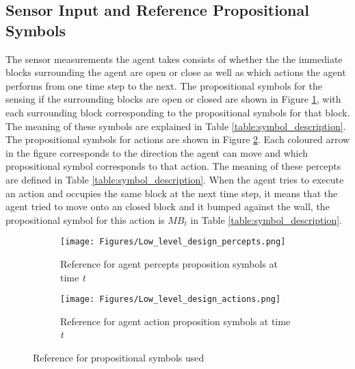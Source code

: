 \subsection{Sensor Input and Reference Propositional Symbols}
\label{subsec: sensor_prop_symbols}

The sensor measurements the agent takes consists of whether the the immediate blocks surrounding the agent are open or close as well as which actions the agent performs from one time step to the next. The propositional symbols for the sensing if the surrounding blocks are open or closed are shown in Figure \ref{subfig:agent_in_env_low_level_percepts}, with each surrounding block corresponding to the propositional symbols for that block. The meaning of these symbols are explained in Table \ref{table:symbol_description}. The propositional symbols for actions are shown in  Figure \ref{subfig:agent_in_env_low_level_action}. Each coloured arrow in the figure corresponds to the direction the agent can move and which propositional symbol corresponds to that action. The meaning of these percepts are defined in Table \ref{table:symbol_description}. When the agent tries to execute an action and occupies the same block at the next time step, it means that the agent tried to move onto an closed block and it bumped against the wall, the propositional symbol for this action is $MB_{t}$ in Table \ref{table:symbol_description}.

\begin{figure}[H]
\captionsetup[subfigure]{justification=centering}
\centering
\begin{subfigure}{.5\textwidth}
    \centering
    \texttt{[image: Figures/Low\_level\_design\_percepts.png]}
    \caption{Reference for agent percepts proposition symbols at time \textit{t}} 
    \label{subfig:agent_in_env_low_level_percepts}
\end{subfigure}%
\begin{subfigure}{.5\textwidth}
    \centering
    \texttt{[image: Figures/Low\_level\_design\_actions.png]}
    \caption{Reference for agent action proposition symbols at time \textit{t}} 
    \label{subfig:agent_in_env_low_level_action}
\end{subfigure}
\caption{Reference for propositional symbols used}
\label{fig:test}
\end{figure}



